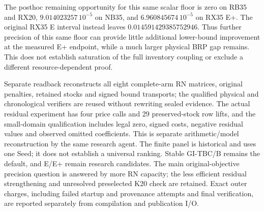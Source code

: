 The posthoc remaining opportunity for this same scalar floor is zero on
RB35 and RX20, $9.014023257\,10^{-5}$ on NB35, and
$6.960845674\,10^{-5}$ on RX35 E+. The original RX35 E interval instead
leaves $0.014591429385752946$. Thus further precision of this same floor
can provide little additional lower-bound improvement at the measured E+ endpoint, while a much
larger physical BRP gap remains. This does not establish saturation of the
full inventory coupling or exclude a different resource-dependent proof.

Separate readback reconstructs all eight complete-arm RN matrices,
original penalties, retained stocks and signed bound transports; the
qualified physical and chronological verifiers are reused without rewriting
sealed evidence. The actual residual experiment has four price calls and
29 preserved-stock row lifts, and the small-domain qualification includes
legal zero, signed costs, negative residual values and observed omitted
coefficients. This is separate arithmetic/model reconstruction by the same
research agent. The finite panel is historical and uses one Seed; it does
not establish a universal ranking. Stable GI-TBC/B remains the default,
and E/E+ remain research candidates. The main original-objective precision
question is answered by more RN capacity; the less efficient residual
strengthening and unresolved preselected K20 check are retained. Exact
outer charges, including failed startup and provenance attempts and final
verification, are reported separately from compilation and publication I/O.
